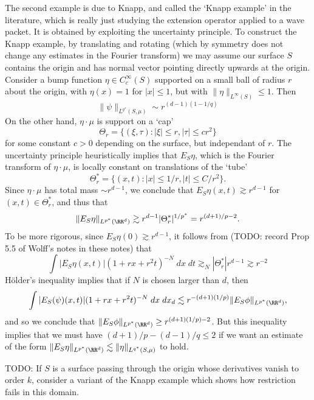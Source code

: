 The second example is due to Knapp, and called the `Knapp example' in the literature, which is really just studying the extension operator applied to a wave packet. It is obtained by exploiting the uncertainty principle. To construct the Knapp example, by translating and rotating (which by symmetry does not change any estimates in the Fourier transform) we may assume our surface $S$ contains the origin and has normal vector pointing directly upwards at the origin. Consider a bump function $\eta \in C_c^\infty(S)$ supported on a small ball of radius $r$ about the origin, with $\eta(x) = 1$ for $|x| \leq 1$, but with $\| \eta \|_{L^\infty(S)} \leq 1$. Then
%
\[ \| \psi \|_{L^{q^*}(S,\mu)} \sim r^{(d-1)(1 - 1/q)} \]
%
On the other hand, $\eta \cdot \mu$ is support on a `cap'
%
\[ \Theta_r = \{ (\xi,\tau) : |\xi| \leq r, |\tau| \leq c r^2 \} \]
%
for some constant $c > 0$ depending on the surface, but independant of $r$. The uncertainty principle heuristically implies that $E_S \eta$, which is the Fourier transform of $\eta \cdot \mu$, is locally constant on translations of the `tube'
%
\[ \Theta_r^* = \{ (x,t) : |x| \leq 1/r, |t| \leq C/r^2 \}. \]
%
Since $\eta \cdot \mu$ has total mass $\sim r^{d-1}$, we conclude that $E_S \eta(x,t) \gtrsim r^{d-1}$ for $(x,t) \in \Theta_r^*$, and thus that
%
\[ \| E_S \eta \|_{L^{p^*}(\RR^d)} \gtrsim r^{d-1} |\Theta_r^*|^{1/p^*} = r^{(d+1)/p - 2}. \]
%
To be more rigorous, since $E_S \eta(0) \gtrsim r^{d-1}$, it follows from (TODO: record Prop 5.5 of Wolff's notes in these notes) that
%
\[ \int |E_S \eta(x,t)| (1 + rx + r^2t)^{-N}\; dx\; dt \gtrsim_N |\Theta_r^*| r^{d-1} \gtrsim r^{-2} \]
%
H\"{o}lder's inequality implies that if $N$ is chosen larger than $d$, then
%
\begin{align*}
  \int |E_S(\psi)(x,t)| (1 + rx + r^2 t)^{-N}\; dx\; dx_d \lesssim r^{-(d+1)(1/p)} \| E_S \phi \|_{L^{p^*}(\RR^d)},
\end{align*}
%
and so we conclude that $\| E_S \phi \|_{L^{p^*}(\RR^d)} \geq r^{(d+1)(1/p) - 2}$. But this inequality implies that we must have $(d+1)/p - (d-1)/q \leq 2$ if we want an estimate of the form $\| E_S \eta \|_{L^{p^*}(\RR^d)} \lesssim \| \eta \|_{L^{q^*}(S,\mu)}$ to hold.

\begin{remark}
  TODO: If $S$ is a surface passing through the origin whose derivatives vanish to order $k$, consider a variant of the Knapp example which shows how restriction fails in this domain.
\end{remark}

